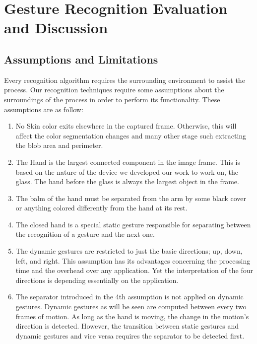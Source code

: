 \chapter{Gesture Recognition Evaluation and Discussion}

\section{Assumptions and Limitations}
Every recognition algorithm requires the surrounding environment to assist the process. Our recognition techniques require some assumptions about the surroundings of the process in order to perform its functionality. These assumptions are as follow:\bigskip

\begin{enumerate}

\item No Skin color exits elsewhere in the captured frame. Otherwise, this will affect the color segmentation changes and many other stage such extracting the blob area and perimeter.

\item The Hand is the largest connected component in the image frame. This is based on the nature of the device we developed our work to work on, the glass. The hand before the glass is always the largest object in the frame.
\bigskip

\item The balm of the hand must be separated from the arm by some black cover or anything colored differently from the hand at its rest. 
\bigskip

\item The closed hand is a special static gesture responsible for separating between the recognition of a gesture and the next one. 
\bigskip

\item The dynamic gestures are restricted to just the basic directions; up, down, left, and right. This assumption has its advantages concerning the processing time and the overhead over any application. Yet the interpretation of the four directions is depending essentially on the application. 
\bigskip

\item The separator introduced in the 4th assumption is not applied on dynamic gestures. Dynamic gestures as will be seen are computed between every two frames of motion. As long as the hand is moving, the change in the motion's direction is detected. However, the transition between static gestures and dynamic gestures and vice versa requires the separator to be detected first. 
\end{enumerate}
\bigskip

